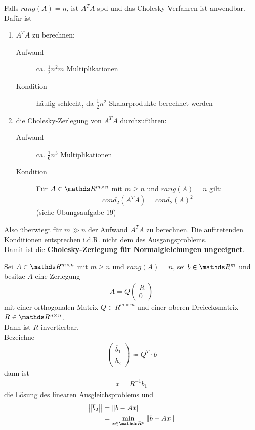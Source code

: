 Falls $rang(A) = n$, ist $A^TA$ spd und das Cholesky-Verfahren ist anwendbar. \\
Dafür ist
\begin{enumerate}[1.]
\item $A^TA$ zu berechnen:
  \begin{description}
  \item[Aufwand] ca. $\frac{1}{2}n^2m$ Multiplikationen 
  \item[Kondition] häufig schlecht, da $\frac{1}{2}n^2$ Skalarprodukte berechnet werden
  \end{description}
\item die Cholesky-Zerlegung von $A^TA $ durchzuführen:
  \begin{description}
  \item[Aufwand] ca. $\frac{1}{6}n^3$ Multiplikationen 
  \item[Kondition] Für $A\in\R^{m\times n}$ mit $m\geq n$ und $rang(A)=n$ gilt:
    \begin{gather}
      cond_2(A^TA) = cond_2(A)^2 \label{IV.3.7}
    \end{gather}
    (siehe Übungsaufgabe 19)
  \end{description}
\end{enumerate}
Also überwiegt für $m\gg n$ der Aufwand $A^TA$ zu berechnen.
Die auftretenden Konditionen entsprechen i.d.R. nicht dem des Ausgangsproblems.\\
Damit ist die 
\textbf{Cholesky-Zerlegung  für Normalgleichungen ungeeignet}.


\begin{Satze}
  Sei $A\in \R^{m\times n} $ mit $m\geq n$ und $rang(A) = n$,
  sei $b\in\R^m$ und besitze $A$ eine Zerlegung
  \begin{gather*}
    A= Q\begin{pmatrix}R\\0\end{pmatrix}
  \end{gather*}
  mit einer orthogonalen Matrix $Q\in R^{m\times m}$ und 
  einer oberen Dreiecksmatrix $R\in \R^{n\times n}$. \\
  Dann ist $R$ invertierbar. \\
  Bezeichne 
  \begin{gather}
    \begin{pmatrix} \overline{b}_1 \\ \overline{b}_2\end{pmatrix}
    \coloneqq Q^T\cdot b
    \label{IV.3.9}
  \end{gather}
  dann ist
  \begin{gather}
    \overline{x} = R^{-1} \overline{b}_1 
    \label{IV.3.10}
  \end{gather}
  die Lösung des linearen Ausgleichsproblems und
  \begin{align*}
    \nn{\overline{b}_2} &= \nn{b-A\overline{x}} \\
                        & = \min_{x\in \Ren }\nn{b-Ax}
  \end{align*}
\end{Satze}

